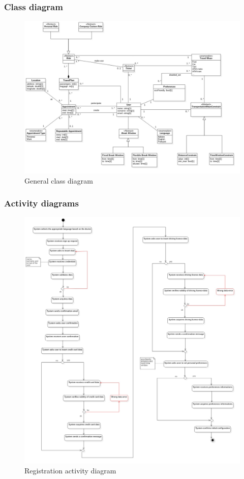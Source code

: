 	\subsubsection{Class diagram}
		\begin{figure}[H]
			\centerline{\includegraphics[width=\paperwidth-1]{Images/ClassDiagram}}
			\caption{General class diagram}
		\end{figure}
	\subsubsection{Activity diagrams}
		\begin{figure}[H]
			\centerline{\includegraphics[height=0.75\paperheight]{Images/RegistrationDiagram}}
			\caption{Registration activity diagram}
		\end{figure}

